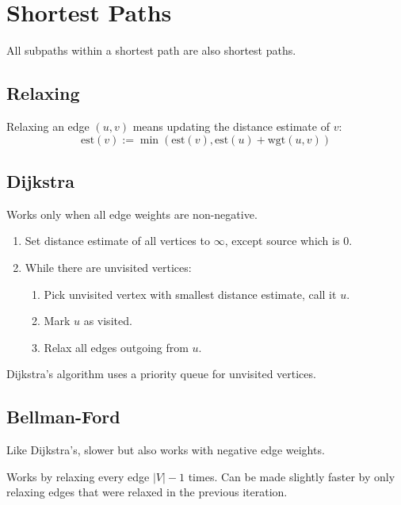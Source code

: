 \section{Shortest Paths}

All subpaths within a shortest path are also shortest paths.


\subsection{Relaxing}
Relaxing an edge $(u,v)$ means updating the distance estimate of $v$:
\[
    \text{est}(v) := \min(\text{est}(v), \text{est}(u) + \text{wgt}(u,v))
\]


\subsection{Dijkstra}
Works only when all edge weights are non-negative.

\begin{enumerate}
    \item Set distance estimate of all vertices to $\infty$, except source which is 0.
    \item While there are unvisited vertices:
    \begin{enumerate}
        \item Pick unvisited vertex with smallest distance estimate, call it $u$.
        \item Mark $u$ as visited.
        \item Relax all edges outgoing from $u$.
    \end{enumerate}
\end{enumerate}

Dijkstra's algorithm uses a priority queue for unvisited vertices.


\subsection{Bellman-Ford}
Like Dijkstra's, slower but also works with negative edge weights. 

Works by relaxing every edge $|V|-1$ times.
Can be made slightly faster by only relaxing edges that were relaxed in the previous iteration.


